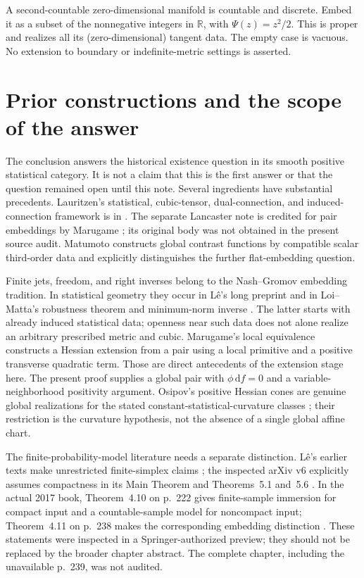 \documentclass[10pt,letterpaper]{article}
\newcommand{\R}{\mathbb R}
\newcommand{\dd}{\mathrm d}
\begin{document}
A second-countable zero-dimensional manifold is countable and discrete.
Embed it as a subset of the nonnegative integers in $\R$, with
$\Psi(z)=z^2/2$. This is proper and realizes all its (zero-dimensional)
tangent data. The empty case is vacuous. No extension to boundary or
indefinite-metric settings is asserted.

\section{Prior constructions and the scope of the answer}

The conclusion answers the historical existence question in its smooth
positive statistical category. It is not a claim that this is the first
answer or that the question remained open until this note. Several
ingredients have substantial precedents. Lauritzen's statistical,
cubic-tensor, dual-connection, and induced-connection framework is in
\cite{LauritzenIMS}. The separate Lancaster note \cite{LauritzenPair}
is credited for pair embeddings by Marugame
\cite[\S2.4]{Marugame}; its original body was not obtained in the present
source audit. Matumoto \cite[Theorem~1 and proof, pp.~328--331]{Matumoto}
constructs global contrast functions by compatible scalar third-order data
and explicitly distinguishes the further flat-embedding question.

Finite jets, freedom, and right inverses belong to the Nash--Gromov
embedding tradition. In statistical geometry they occur in L\^e's long
preprint \cite[pp.~33--39]{Le2003} and in Loi--Matta's robustness theorem
and minimum-norm inverse \cite{LoiMatta}. The latter starts with already
induced statistical data; openness near such data does not alone realize
an arbitrary prescribed metric and cubic. Marugame's local equivalence
\cite[Theorem~2.2, \S2.4]{Marugame} constructs a Hessian extension from a
pair using a local primitive and a positive transverse quadratic term.
Those are direct antecedents of the extension stage here. The present
proof supplies a global pair with $\phi\,\dd f=0$ and a variable-neighborhood
positivity argument. Osipov's positive Hessian cones are genuine global
realizations for the stated constant-statistical-curvature classes
\cite{Osipov}; their restriction is the curvature hypothesis, not the
absence of a single global affine chart.

The finite-probability-model literature needs a separate distinction.
L\^e's earlier texts make unrestricted finite-simplex claims
\cite{Le2003,Le2006,Le2007}; the inspected arXiv v6 explicitly assumes
compactness in its Main Theorem and Theorems~5.1 and~5.6 \cite{Le2016}.
In the actual 2017 book, Theorem~4.10 on p.~222 gives finite-sample
immersion for compact input and a countable-sample model for noncompact
input; Theorem~4.11 on p.~238 makes the corresponding embedding distinction
\cite{AJLS}. These statements were inspected in a Springer-authorized
preview; they should not be replaced by the broader chapter abstract.
The complete chapter, including the unavailable p.~239, was not audited.
\end{document}
